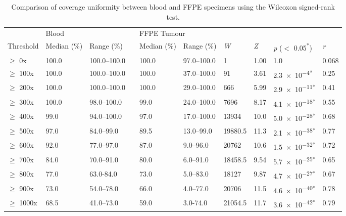 
\begin{table}[H]
\caption{Comparison of coverage uniformity between blood and FFPE specimens using the Wilcoxon signed-rank test.}
\label{tbl:metrics}
\centering
      \begin{tabular}{llllllllll}
        \hline
				\multicolumn{1}{l}{ }
				&
				\multicolumn{2}{l}{Blood}
				&&
				\multicolumn{2}{l}{FFPE Tumour}
				&
				\multicolumn{4}{l}{ } \\
				\cline{2-3}\cline{5-6}
        Threshold & Median (\%) & Range (\%) && Median (\%) & Range (\%) & \textit{W} & \textit{Z} & \textit{p} ($<$ 0.05\textsuperscript{*}) & \textit{r}
				\\
				\hline
				$\geq$ 0x & 100.0 & 100.0--100.0 && 100.0 & 97.0--100.0 & 1 & 1.00 & 1.0 & 0.068
				\\
				$\geq$ 100x & 100.0 & 100.0--100.0 && 100.0 & 37.0--100.0 & 91 & 3.61 & \num{2.3e-4}\textsuperscript{*} & 0.25
				\\
				$\geq$ 200x & 100.0 & 100.0--100.0 && 100.0 & 29.0--100.0 & 666 & 5.99 & \num{2.9e-11}\textsuperscript{*} & 0.41
				\\
				$\geq$ 300x & 100.0 & 98.0--100.0 && 99.0 & 24.0--100.0 & 7696 & 8.17 & \num{4.1e-18}\textsuperscript{*} & 0.55
				\\
				$\geq$ 400x & 99.0 & 94.0--100.0 && 97.0 & 17.0--100.0 & 13934 & 10.0 & \num{5.0e-28}\textsuperscript{*} & 0.68
				\\
				$\geq$ 500x & 97.0 & 84.0--99.0 && 89.5 & 13.0--99.0 & 19880.5 & 11.3 & \num{2.1e-38}\textsuperscript{*} & 0.77
				\\
				$\geq$ 600x & 92.0 & 77.0--97.0 && 87.0 & 9.0--96.0 & 20762 & 10.6 & \num{1.5e-32}\textsuperscript{*} & 0.72
				\\
				$\geq$ 700x & 84.0 & 70.0--91.0 && 80.0 & 6.0--91.0 & 18458.5 & 9.54 & \num{5.7e-25}\textsuperscript{*} & 0.65
				\\
				$\geq$ 800x & 77.0 & 63.0-84.0 && 73.0 & 5.0--83.0 & 18127 & 9.87 & \num{4.7e-27}\textsuperscript{*} & 0.67
				\\
				$\geq$ 900x & 73.0 & 54.0--78.0 && 66.0 & 4.0--77.0 & 20706 & 11.5 & \num{4.6e-40}\textsuperscript{*} & 0.78
				\\
				$\geq$ 1000x & 68.5 & 41.0--73.0 && 59.0 & 3.0-74.0 & 21054.5 & 11.7 & \num{3.6e-42}\textsuperscript{*} & 0.79
				\\
				\hline
      \end{tabular} \\
\end{table}

